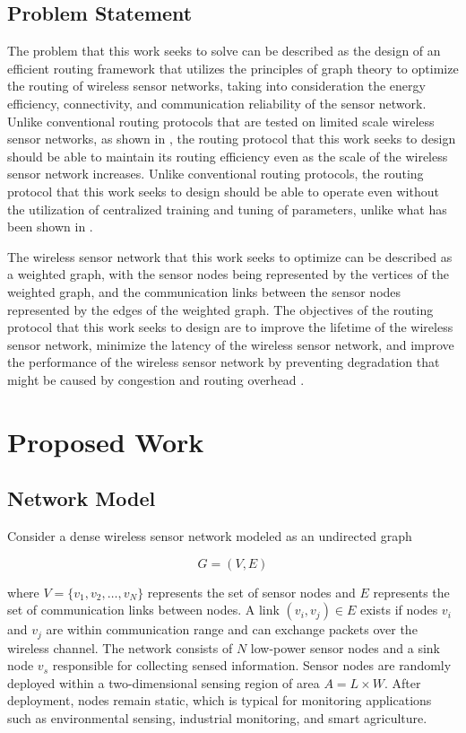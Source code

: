 \documentclass[a4paper,fleqn]{cas-dc}
\numberwithin{equation}{section}
\begin{document}
\subsection{Problem Statement}

The problem that this work seeks to solve can be described as the design of an efficient routing framework that utilizes the principles of graph theory to optimize the routing of wireless sensor networks, taking into consideration the energy efficiency, connectivity, and communication reliability of the sensor network. Unlike conventional routing protocols that are tested on limited scale wireless sensor networks, as shown in \cite{B1,B3,r8}, the routing protocol that this work seeks to design should be able to maintain its routing efficiency even as the scale of the wireless sensor network increases. Unlike conventional routing protocols, the routing protocol that this work seeks to design should be able to operate even without the utilization of centralized training and tuning of parameters, unlike what has been shown in \cite{r2,r30}.

The wireless sensor network that this work seeks to optimize can be described as a weighted graph, with the sensor nodes being represented by the vertices of the weighted graph, and the communication links between the sensor nodes represented by the edges of the weighted graph. The objectives of the routing protocol that this work seeks to design are to improve the lifetime of the wireless sensor network, minimize the latency of the wireless sensor network, and improve the performance of the wireless sensor network by preventing degradation that might be caused by congestion and routing overhead \cite{B1,B3,r8}.

\section{Proposed Work}

\subsection{Network Model}

Consider a dense wireless sensor network modeled as an undirected graph

\begin{equation}
G = (V,E)
\end{equation}

where $V = \{v_1, v_2, \ldots, v_N\}$ represents the set of sensor nodes and $E$ represents the set of communication links between nodes. A link $(v_i, v_j) \in E$ exists if nodes $v_i$ and $v_j$ are within communication range and can exchange packets over the wireless channel. The network consists of $N$ low-power sensor nodes and a sink node $v_s$ responsible for collecting sensed information. Sensor nodes are randomly deployed within a two-dimensional sensing region of area $A = L \times W$. After deployment, nodes remain static, which is typical for monitoring applications such as environmental sensing, industrial monitoring, and smart agriculture.
\end{document}
